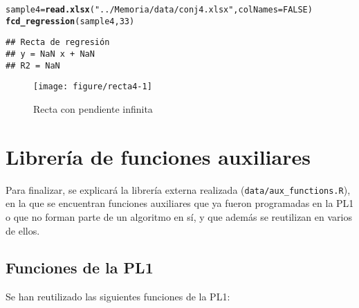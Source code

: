 \documentclass[12pt]{report}\usepackage[]{graphicx}\usepackage[dvipsnames]{xcolor}
\makeatletter
\def\maxwidth{ %
  \ifdim\Gin@nat@width>\linewidth
    \linewidth
  \else
    \Gin@nat@width
  \fi
}
\newcommand{\hlnum}[1]{\textcolor[rgb]{0.686,0.059,0.569}{#1}}%
\newcommand{\hlstr}[1]{\textcolor[rgb]{0.192,0.494,0.8}{#1}}%
\newcommand{\hlstd}[1]{\textcolor[rgb]{0.345,0.345,0.345}{#1}}%
\newcommand{\hlkwb}[1]{\textcolor[rgb]{0.69,0.353,0.396}{#1}}%
\newcommand{\hlkwc}[1]{\textcolor[rgb]{0.333,0.667,0.333}{#1}}%
\newcommand{\hlkwd}[1]{\textcolor[rgb]{0.737,0.353,0.396}{\textbf{#1}}}%
\newenvironment{kframe}{%
 \def\at@end@of@kframe{}%
 \ifinner\ifhmode%
  \def\at@end@of@kframe{\end{minipage}}%
  \begin{minipage}{\columnwidth}%
 \fi\fi%
 \def\FrameCommand##1{\hskip\@totalleftmargin \hskip-\fboxsep
 \colorbox{shadecolor}{##1}\hskip-\fboxsep
     \hskip-\linewidth \hskip-\@totalleftmargin \hskip\columnwidth}%
 \MakeFramed {\advance\hsize-\width
   \@totalleftmargin\z@ \linewidth\hsize
   \@setminipage}}%
 {\par\unskip\endMakeFramed%
 \at@end@of@kframe}
\newenvironment{knitrout}{}{} %
\makeatother
\begin{document}
\begin{knitrout}
\color{fgcolor}\begin{kframe}
\begin{alltt}
\hlstd{sample4} \hlkwb{=} \hlkwd{read.xlsx}\hlstd{(}\hlstr{"../Memoria/data/conj4.xlsx"}\hlstd{,} \hlkwc{colNames}\hlstd{=}\hlnum{FALSE}\hlstd{)}
\hlkwd{fcd_regression}\hlstd{(sample4,} \hlnum{33}\hlstd{)}
\end{alltt}
\begin{verbatim}
## Recta de regresión
## y = NaN x + NaN 
## R2 = NaN
\end{verbatim}


{\ttfamily\noindent\bfseries\color{errorcolor}{\#\# Error in int\_abline(a = a, b = b, h = h, v = v, untf = untf, ...): 'a' y 'b' deben ser finitos}}\end{kframe}\begin{figure}[H]

{\centering \texttt{[image: figure/recta4-1]} 

}

\caption[Recta con pendiente infinita]{Recta con pendiente infinita}\label{fig:recta4}
\end{figure}

\end{knitrout}
 				
 	\appendix
 	
 	\chapter{Librería de funciones auxiliares}\label{ap:Libreria}
 	
	 	Para finalizar, se explicará la librería externa realizada (\texttt{data/aux\_functions.R}), en la que se encuentran funciones auxiliares que ya fueron programadas en la PL1 o que no forman parte de un algoritmo en sí, y que además se reutilizan en varios de ellos.
	 	
	 	\section{Funciones de la PL1}
	 	
		 	Se han reutilizado las siguientes funciones de la PL1:
		 	
\end{document}
